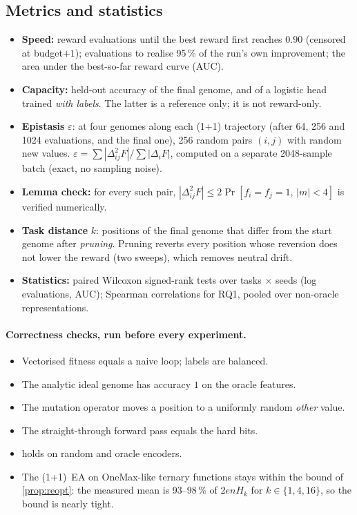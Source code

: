 \documentclass[11pt,a4paper]{article}
\theoremstyle{definition}
\theoremstyle{plain}
\theoremstyle{remark}
\begin{document}
\subsection{Metrics and statistics}
\begin{itemize}
\item \textbf{Speed:} reward evaluations until the best reward first reaches $0.90$ (censored at budget$+1$); evaluations to realise 95\,\% of the run's own improvement; the area under the best-so-far reward curve (AUC).
\item \textbf{Capacity:} held-out accuracy of the final genome, and of a logistic head trained \emph{with labels}. The latter is a reference only; it is not reward-only.
\item \textbf{Epistasis} $\varepsilon$: at four genomes along each (1+1) trajectory (after 64, 256 and 1024 evaluations, and the final one), 256 random pairs $(i,j)$ with random new values. $\varepsilon = \sum|\Delta^2_{ij}F| / \sum|\Delta_iF|$, computed on a separate 2048-sample batch (exact, no sampling noise).
\item \textbf{Lemma check:} for every such pair, $|\Delta^2_{ij}F|\le 2\Pr[f_i{=}f_j{=}1,\,|m|<4]$ is verified numerically.
\item \textbf{Task distance} $k$: positions of the final genome that differ from the start genome after \emph{pruning}. Pruning reverts every position whose reversion does not lower the reward (two sweeps), which removes neutral drift.
\item \textbf{Statistics:} paired Wilcoxon signed-rank tests over tasks $\times$ seeds (log evaluations, AUC); Spearman correlations for RQ1, pooled over non-oracle representations.
\end{itemize}

\paragraph{Correctness checks, run before every experiment.}
\begin{itemize}
\item Vectorised fitness equals a naive loop; labels are balanced.
\item The analytic ideal genome has accuracy $1$ on the oracle features.
\item The mutation operator moves a position to a uniformly random \emph{other} value.
\item The straight-through forward pass equals the hard bits.
\item {} holds on random and oracle encoders.
\item The (1+1)~EA on OneMax-like ternary functions stays within the bound of \cref{prop:reopt}: the measured mean is 93--98\,\% of $2enH_k$ for $k\in\{1,4,16\}$, so the bound is nearly tight.
\end{itemize}
\end{document}
